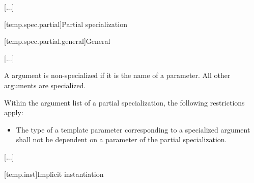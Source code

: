 \documentclass{wg21}
\begin{document}
\textcolor{noteclr}{[...]}

[temp.spec.partial]{Partial specialization}

[temp.spec.partial.general]{General}

\textcolor{noteclr}{[...]}

\pnum
A  argument is non-specialized if it is the name of a 
parameter.
All other  arguments are specialized.

\pnum
Within the argument list of a partial specialization,
the following restrictions apply:

\begin{itemize}
    \item
    The type of a template parameter corresponding to a specialized  argument
    shall not be dependent on a parameter of the partial specialization.
\end{itemize}

\textcolor{noteclr}{[...]}

[temp.inst]{Implicit instantiation}
\end{document}
